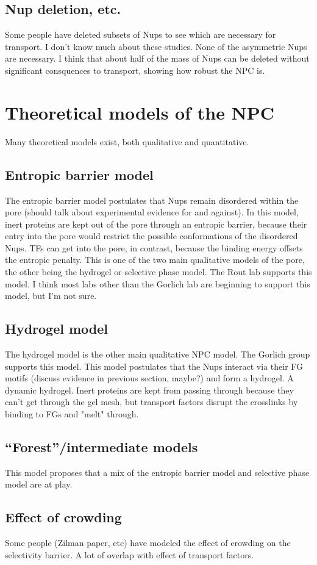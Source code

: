 \subsection{Nup deletion, etc.}
Some people have deleted subsets of Nups to see which are necessary for transport.  I don't know much about these studies.  None of the asymmetric Nups are necessary.  I think that about half of the mass of Nups can be deleted without significant consquences to transport, showing how robust the NPC is.
\section{Theoretical models of the NPC}
Many theoretical models exist, both qualitative and quantitative.
\subsection{Entropic barrier model}
The entropic barrier model postulates that Nups remain disordered within the pore (should talk about experimental evidence for and against).  In this model, inert proteins are kept out of the pore through an entropic barrier, because their entry into the pore would restrict the possible conformations of the disordered Nups.  TFs can get into the pore, in contrast, because the binding energy offsets the entropic penalty.  This is one of the two main qualitative models of the pore, the other being the hydrogel or selective phase model.  The Rout lab supports this model.  I think most labs other than the Gorlich lab are beginning to support this model, but I'm not sure.
\subsection{Hydrogel model}
The hydrogel model is the other main qualitative NPC model.  The Gorlich group supports this model.  This model postulates that the Nups interact via their FG motifs (discuss evidence in previous section, maybe?) and form a hydrogel.  A dynamic hydrogel.  Inert proteins are kept from passing through because they can't get through the gel mesh, but transport factors disrupt the crosslinks by binding to FGs and "melt" through.
\subsection{“Forest”/intermediate models}
This model proposes that a mix of the entropic barrier model and selective phase model are at play.
\subsection{Effect of crowding}
Some people (Zilman paper, etc) have modeled the effect of crowding on the selectivity barrier.  A lot of overlap with effect of transport factors.
